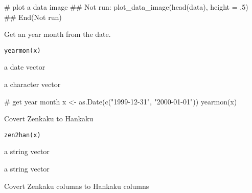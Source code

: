 \documentclass[letterpaper]{book}
\begin{document}
%
\begin{Examples}
\begin{ExampleCode}
# plot a data image
## Not run: 
plot_data_image(head(data), height = .5)
## End(Not run)

\end{ExampleCode}
\end{Examples}
%
\begin{Description}
Get an year month from the date.
\end{Description}
%
\begin{Usage}
\begin{verbatim}
yearmon(x)
\end{verbatim}
\end{Usage}
%
\begin{Arguments}
\begin{ldescription}
\item[\code{x}] a date vector
\end{ldescription}
\end{Arguments}
%
\begin{Value}
a character vector
\end{Value}
%
\begin{Examples}
\begin{ExampleCode}
# get year month
x <- as.Date(c("1999-12-31", "2000-01-01"))
yearmon(x)

\end{ExampleCode}
\end{Examples}
%
\begin{Description}
Covert Zenkaku to Hankaku
\end{Description}
%
\begin{Usage}
\begin{verbatim}
zen2han(x)
\end{verbatim}
\end{Usage}
%
\begin{Arguments}
\begin{ldescription}
\item[\code{x}] a string vector
\end{ldescription}
\end{Arguments}
%
\begin{Value}
a string vector
\end{Value}
%
\begin{Description}
Covert Zenkaku columns to Hankaku columns
\end{Description}
\end{document}
